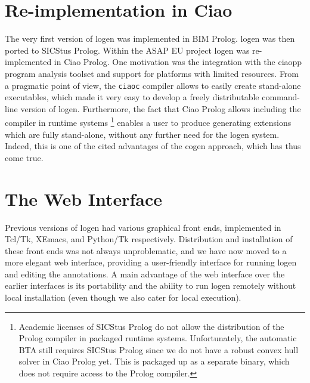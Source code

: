 \documentclass{sig-alternate}
\begin{document}

\section{Re-implementation in Ciao}

The very first version of {\sc logen} \cite{JorgensenLeuschel:Cogen} was
 implemented in BIM Prolog. {\sc logen} was then ported to
   SICStus Prolog.
Within the ASAP EU project  {\sc logen} was re-implemented in
 Ciao Prolog.
 One motivation was the integration with the {\sc ciaopp} program
  analysis toolset and support for platforms with limited resources.
From a pragmatic point of view, the
{\tt ciaoc} compiler allows to easily create stand-alone executables, which made
it very easy to develop a freely distributable command-line version of {\sc logen}.
Furthermore, the fact that Ciao Prolog allows including the compiler
 in runtime systems%
\footnote{Academic licenses of SICStus Prolog do not allow the distribution
 of the Prolog compiler in packaged runtime systems.
Unfortunately, the
 automatic BTA still requires SICStus Prolog since we do not have 
 a robust convex hull solver in Ciao Prolog yet.
This is packaged up as a separate binary, which does not require access to
 the Prolog compiler.}
enables a user to produce generating extensions which are fully stand-alone,
without any further need for the  {\sc logen}
  system.
 Indeed, this is one of the cited advantages of the {\sc cogen} approach, which has thus
 come true.



\section{The Web Interface}

Previous versions of {\sc logen} had various graphical front ends,
 implemented in Tcl/Tk, XEmacs, and Python/Tk respectively.
Distribution and installation of these front ends was not always unproblematic,
and we have now moved to a more elegant web interface, providing a user-friendly interface
for running {\sc logen} and editing the annotations.
A main advantage of the web interface over the earlier interfaces is its portability and
 the ability to run {\sc logen} remotely
  without local installation (even though we also cater for local execution).
  
  
\end{document}
